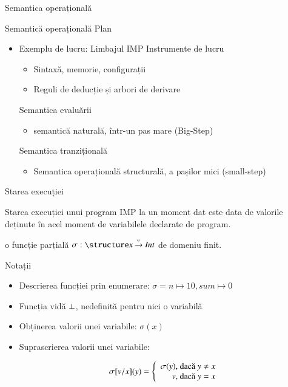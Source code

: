 \documentclass[xcolor=pdftex,romanian,colorlinks]{beamer}
\begin{document}
\begin{section}{Semantica operațională}
\begin{frame}{Semantică operațională}
{Plan}
\begin{itemize}
 \item Exemplu de lucru: Limbajul IMP
 \vitem Instrumente de lucru
 \begin{itemize}
  \item Sintaxă, memorie, configurații
  \item Reguli de deducție și arbori de derivare
 \end{itemize}
 \vitem Semantica evaluării
   \begin{itemize}
     \item semantică naturală, într-un pas mare (Big-Step)
	\end{itemize}
 \vitem Semantica tranzițională
	\begin{itemize}
		\item Semantica operațională structurală, a pașilor mici (small-step)
	\end{itemize}
 \end{itemize}
\end{frame}

\begin{frame}{Starea execuției}
\begin{block}{}
Starea execuției unui program IMP la un moment dat este data de valorile deținute în acel moment de variabilele declarate de program.

 o funcție \alert{parțială} $\sigma : \Id \xrightarrow{\circ}\SInt$ de domeniu finit.
\end{block}
\begin{block}{Notații}
\begin{itemize}
\item Descrierea funcției prin enumerare:
$\sigma = n \mapsto 10, sum \mapsto 0$
\item Funcția vidă $\perp$, nedefinită pentru nici o variabilă
\item Obținerea valorii unei variabile: $\sigma(x)$
\item Suprascrierea valorii unei variabile:

$$\sigma[v/x] (y) = \left\{\begin{array}{r@{\mbox{, dacă }}l}
\sigma	(y) & y \neq x \\
v & y = x
\end{array}
\right.$$
\end{itemize}
\end{block}
\end{frame}


\end{section}
\end{document}
